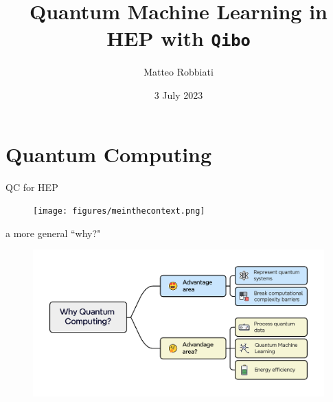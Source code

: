 \documentclass[8pt, xcolor={svgnames}, hyperref={linkcolor=black}]{beamer}
\title{Quantum Machine Learning in HEP with \texttt{Qibo}}
\date{3 July 2023}
\author{Matteo Robbiati}
\begin{document}
\begin{frame}
\maketitle
\end{frame}

\section{Quantum Computing}


\begin{frame}{QC for HEP}
\begin{figure}  
    \texttt{[image: figures/meinthecontext.png]}
\end{figure}
\end{frame}

\begin{frame}{a more general ``why?"}
\begin{figure}  
    \includegraphics[width=1\textwidth]{figures/whyQC.pdf}
\end{figure}
\end{frame}
\end{document}
